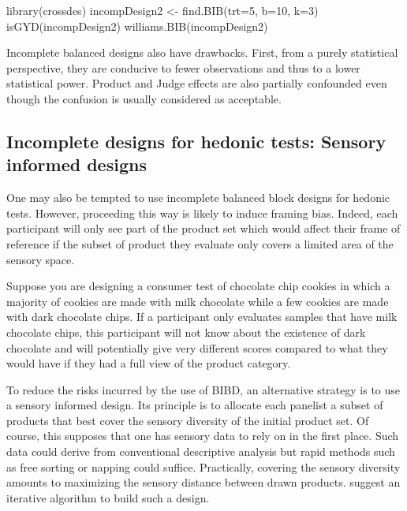 \documentclass[
]{krantz}
\makeatletter
\newenvironment{Shaded}{\begin{snugshade}}{\end{snugshade}}
\newcommand{\AttributeTok}[1]{\textcolor[rgb]{0.61,0.61,0.61}{#1}}
\newcommand{\DecValTok}[1]{\textcolor[rgb]{0.06,0.06,0.06}{#1}}
\newcommand{\FunctionTok}[1]{\textcolor[rgb]{0,0,0}{#1}}
\newcommand{\NormalTok}[1]{#1}
\newcommand{\OtherTok}[1]{\textcolor[rgb]{0.37,0.37,0.37}{#1}}
\newenvironment{kframe}{%
\medskip{}
\setlength{\fboxsep}{.8em}
 \def\at@end@of@kframe{}%
 \ifinner\ifhmode%
  \def\at@end@of@kframe{\end{minipage}}%
  \begin{minipage}{\columnwidth}%
 \fi\fi%
 \def\FrameCommand##1{\hskip\@totalleftmargin \hskip-\fboxsep
 \colorbox{shadecolor}{##1}\hskip-\fboxsep
     \hskip-\linewidth \hskip-\@totalleftmargin \hskip\columnwidth}%
 \MakeFramed {\advance\hsize-\width
   \@totalleftmargin\z@ \linewidth\hsize
   \@setminipage}}%
 {\par\unskip\endMakeFramed%
 \at@end@of@kframe}
\renewenvironment{Shaded}{\begin{kframe}}{\end{kframe}}
\makeatother
\begin{document}
\begin{Shaded}
\begin{Highlighting}[]
\FunctionTok{library}\NormalTok{(crossdes)}
\NormalTok{incompDesign2 }\OtherTok{\textless{}{-}} \FunctionTok{find.BIB}\NormalTok{(}\AttributeTok{trt=}\DecValTok{5}\NormalTok{, }\AttributeTok{b=}\DecValTok{10}\NormalTok{, }\AttributeTok{k=}\DecValTok{3}\NormalTok{)}
\FunctionTok{isGYD}\NormalTok{(incompDesign2)}
\FunctionTok{williams.BIB}\NormalTok{(incompDesign2)}
\end{Highlighting}
\end{Shaded}

Incomplete balanced designs also have drawbacks. First, from a purely statistical perspective, they are conducive to fewer observations and thus to a lower statistical power. Product and Judge effects are also partially confounded even though the confusion is usually considered as acceptable.

\hypertarget{hedo_informdes}{%
\subsection{Incomplete designs for hedonic tests: Sensory informed designs}\label{hedo_informdes}}

One may also be tempted to use incomplete balanced block designs for hedonic tests. However, proceeding this way is likely to induce framing bias. Indeed, each participant will only see part of the product set which would affect their frame of reference if the subset of product they evaluate only covers a limited area of the sensory space.

Suppose you are designing a consumer test of chocolate chip cookies in which a majority of cookies are made with milk chocolate while a few cookies are made with dark chocolate chips. If a participant only evaluates samples that have milk chocolate chips, this participant will not know about the existence of dark chocolate and will potentially give very different scores compared to what they would have if they had a full view of the product category.

To reduce the risks incurred by the use of BIBD, an alternative strategy is to use a sensory informed design. Its principle is to allocate each panelist a subset of products that best cover the sensory diversity of the initial product set. Of course, this supposes that one has sensory data to rely on in the first place. Such data could derive from conventional descriptive analysis but rapid methods such as free sorting or napping could suffice.
Practically, covering the sensory diversity amounts to maximizing the sensory distance between drawn products. \citet{Franczak2015} suggest an iterative algorithm to build such a design.
\end{document}
